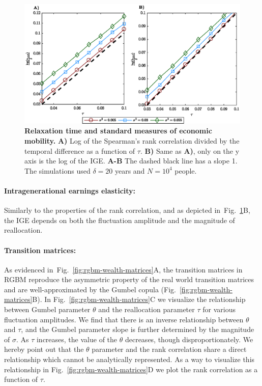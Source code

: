 \documentclass[11pt]{article}
\newcommand{\fref}[1]{Fig.~\ref{fig:#1}}
\numberwithin{equation}{section}
\begin{document}
\begin{figure}[!htb]
\centering
\includegraphics[width=1.0\textwidth]{figs/fig_rgbm_standard_measures.eps}
\caption{\textbf{Relaxation time and standard measures of economic mobility.} \textbf{A)} Log of the Spearman's rank correlation divided by the temporal difference as a function of $\tau$. \textbf{B)} Same as \textbf{A)}, only on the y axis is the log of the IGE. \textbf{A-B} The dashed black line has a slope 1. The simulations used $\delta = 20$ years and $N = 10^4$ people.
\label{fig:rgbm-standard-measures}}
\end{figure}

\paragraph{Intragenerational earnings elasticity:} Similarly to the properties of the rank correlation, and as depicted in~\fref{rgbm-standard-measures}B, the IGE depends on both the fluctuation amplitude and the magnitude of reallocation.

\paragraph{Transition matrices:} As evidenced in~\fref{rgbm-wealth-matrices}A, the transition matrices in RGBM reproduce the asymmetric property of the real world transition matrices and are well-approximated by the Gumbel copula (\fref{rgbm-wealth-matrices}B). In \fref{rgbm-wealth-matrices}C we visualize the relationship between Gumbel parameter $\theta$ and the reallocation parameter $\tau$ for various fluctuation amplitudes. We find that there is an inverse relationship between $\theta$ and $\tau$, and the Gumbel parameter slope is further determined by the magnitude of $\sigma$. As $\tau$ increases, the value of the $\theta$ decreases, though disproportionately. We hereby point out that the $\theta$ parameter and the rank correlation share a direct relationship which cannot be analytically represented. As a way to visualize this relationship in \fref{rgbm-wealth-matrices}D we plot the rank correlation as a function of $\tau$.
\end{document}
